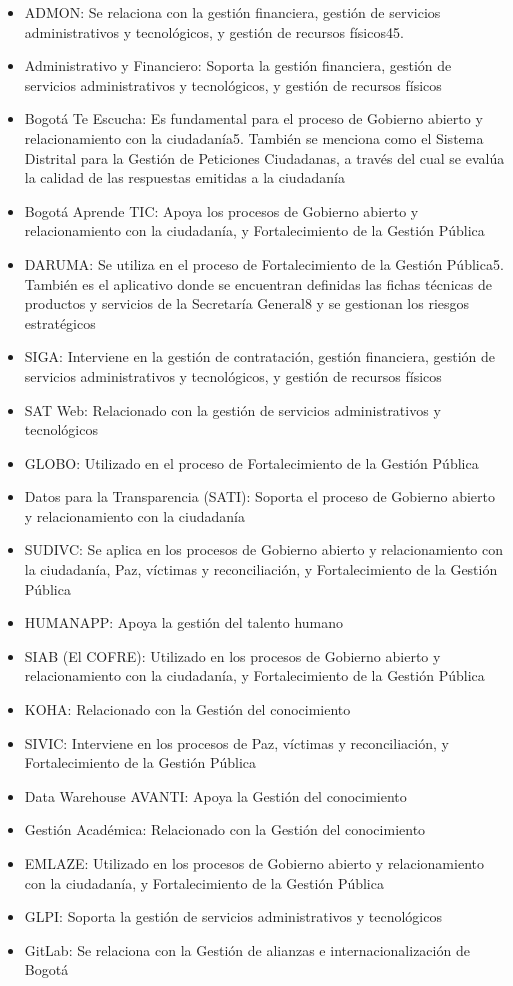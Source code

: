 \documentclass[
	a4paper, %
	12pt, %
]{include/CSSullivanBusinessReport}
\def\tightlist{}
\begin{document}
\begin{itemize}
\tightlist
\item
  ADMON: Se relaciona con la gestión financiera, gestión de servicios
  administrativos y tecnológicos, y gestión de recursos físicos45.
\item
  Administrativo y Financiero: Soporta la gestión financiera, gestión de
  servicios administrativos y tecnológicos, y gestión de recursos
  físicos
\item
  Bogotá Te Escucha: Es fundamental para el proceso de Gobierno abierto
  y relacionamiento con la ciudadanía5. También se menciona como el
  Sistema Distrital para la Gestión de Peticiones Ciudadanas, a través
  del cual se evalúa la calidad de las respuestas emitidas a la
  ciudadanía
\item
  Bogotá Aprende TIC: Apoya los procesos de Gobierno abierto y
  relacionamiento con la ciudadanía, y Fortalecimiento de la Gestión
  Pública
\item
  DARUMA: Se utiliza en el proceso de Fortalecimiento de la Gestión
  Pública5. También es el aplicativo donde se encuentran definidas las
  fichas técnicas de productos y servicios de la Secretaría General8 y
  se gestionan los riesgos estratégicos
\item
  SIGA: Interviene en la gestión de contratación, gestión financiera,
  gestión de servicios administrativos y tecnológicos, y gestión de
  recursos físicos
\item
  SAT Web: Relacionado con la gestión de servicios administrativos y
  tecnológicos
\item
  GLOBO: Utilizado en el proceso de Fortalecimiento de la Gestión
  Pública
\item
  Datos para la Transparencia (SATI): Soporta el proceso de Gobierno
  abierto y relacionamiento con la ciudadanía
\item
  SUDIVC: Se aplica en los procesos de Gobierno abierto y
  relacionamiento con la ciudadanía, Paz, víctimas y reconciliación, y
  Fortalecimiento de la Gestión Pública
\item
  HUMANAPP: Apoya la gestión del talento humano
\item
  SIAB (El COFRE): Utilizado en los procesos de Gobierno abierto y
  relacionamiento con la ciudadanía, y Fortalecimiento de la Gestión
  Pública
\item
  KOHA: Relacionado con la Gestión del conocimiento
\item
  SIVIC: Interviene en los procesos de Paz, víctimas y reconciliación, y
  Fortalecimiento de la Gestión Pública
\item
  Data Warehouse AVANTI: Apoya la Gestión del conocimiento
\item
  Gestión Académica: Relacionado con la Gestión del conocimiento
\item
  EMLAZE: Utilizado en los procesos de Gobierno abierto y
  relacionamiento con la ciudadanía, y Fortalecimiento de la Gestión
  Pública
\item
  GLPI: Soporta la gestión de servicios administrativos y tecnológicos
\item
  GitLab: Se relaciona con la Gestión de alianzas e internacionalización
  de Bogotá
\end{itemize}
\end{document}
